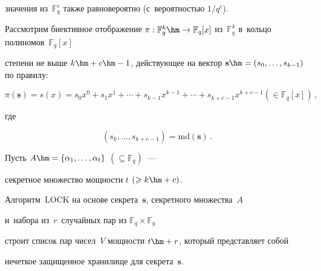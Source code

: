  значения из~$\mathbb{F}^c_q$ также равновероятно (с~вероятностью $1/q^{c}$). 


 Рассмотрим биективное  отображение $\pi:\mathbb{F}^{k}_q\hm\rightarrow 


 \mathbb{F}_q[x]$ из~$\mathbb{F}^{k}_q$ в~кольцо полиномов~$\mathbb{F}_q[x]$ 


 степени не выше $k\hm+c\hm-1$, действующее на вектор $\mathbf{s}\hm=(s_0,\ldots,


 s_{k-1})$ по правилу:


\begin{equation}


\label{pi_map}


\pi(\mathbf{s})=s(x)=s_0x^{0}+s_1x^1+\cdots+s_{k-1}x^{k-1}+\cdots


+s_{k+c-1}x^{k+c-1} \left(\in \mathbb{F}_q[x]\right)\,,


\end{equation}


где


\begin{equation}


\label{crc_md}


(s_k,\ldots,s_{k+c-1})=\mathrm{md}(\mathbf{s})\,.


\end{equation}


Пусть $ A\hm=\{\alpha_1,\ldots,\alpha_t\}$ $(\subseteq \mathbb{F}_q)$~--- 


секретное множество мощности $t$ $(\geqslant k\hm+c)$. 


Алгоритм~$\mathrm{LOCK}$ на основе секрета~$\mathbf{s}$, секретного множества~$A$ 


и~набора из~$r$~случайных пар из $\mathbb{F}_q\times \mathbb{F}_q$ 


строит список пар чисел~$V$ мощности $t\hm+r$, который представляет собой 


нечеткое защищенное хранилище для секрета~$\mathbf{s}$. 


